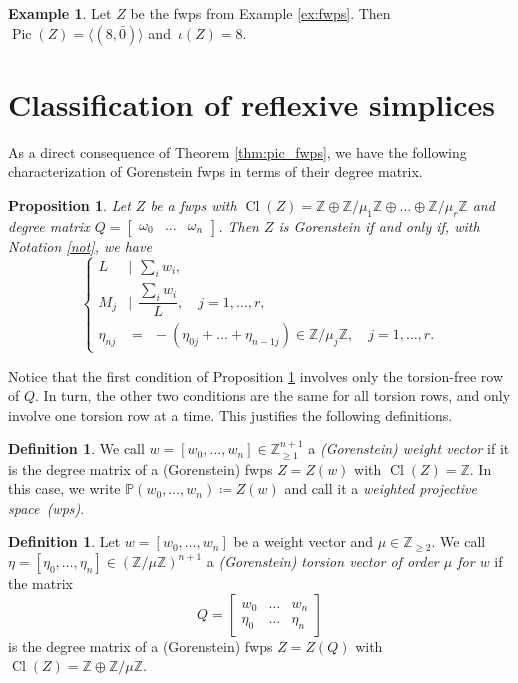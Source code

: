 \documentclass{amsart}
\DeclareMathOperator{\Cl}{Cl}
\DeclareMathOperator{\Pic}{Pic}
\newcommand{\Pp}{\mathbb{P}}
\newcommand{\Z}{\mathbb{Z}}
\newtheorem{proposition}[lem]{Proposition}
\theoremstyle{definition}
\newtheorem{definition}[lem]{Definition}
\newtheorem{example}[lem]{Example}
\begin{document}
\begin{example}
    Let $Z$ be the fwps from Example \ref{ex:fwps}. Then $\Pic(Z)=\langle(8,\bar{0})\rangle$ and~$\iota(Z)=8$.
\end{example}

\section{Classification of reflexive simplices}\label{sec:algos}

As a direct consequence of Theorem \ref{thm:pic_fwps}, we have the following characterization of Gorenstein fwps in terms of their degree matrix.

\begin{proposition}\label{prop:gor_fwps}
    Let $Z$ be a fwps with $\Cl(Z)=\Z\oplus \Z/\mu_1\Z\oplus\dots\oplus\Z/\mu_r\Z$ and  degree matrix $Q=\begin{bmatrix}
        \omega_0 & \dots & \omega_n
    \end{bmatrix}$.
    Then $Z$ is Gorenstein if and only if, with Notation \ref{not}, we have
    $$
    \begin{cases}
        L & | \ \ \sum_i w_i,\\[3pt]
        M_j & | \ \ \dfrac{\sum_{i}w_i}{L},\quad j=1,\dots,r,\\[5pt]
        \eta_{nj} & = \ \ -(\eta_{0j}+\dots+\eta_{n-1j})\in\Z/\mu_j\Z,\quad j=1,\dots,r.
    \end{cases}
    $$
\end{proposition}

Notice that the first condition of Proposition \ref{prop:gor_fwps} involves only the torsion-free row of $Q$. In turn, the other two conditions are the same for all torsion rows, and only involve one torsion row at a time. This justifies the following definitions.

\begin{definition}\label{weight_vec}
    We call $w=[w_0,\dots,w_n]\in\Z^{n+1}_{\geq 1}$ a \emph{(Gorenstein) weight vector} if it is the degree matrix of a (Gorenstein) fwps $Z=Z(w)$ with $\Cl(Z)=\Z$. In this case, we write $\Pp(w_0,\dots,w_n)\coloneqq Z(w)$ and call it a \emph{weighted projective space~(wps)}.
\end{definition}

\begin{definition}\label{def: torsion_vec}
    Let $w=[w_0,\dots,w_n]$ be a weight vector and $\mu\in\Z_{\geq 2}$. We call~$\eta=[\eta_0,\dots,\eta_n]\in(\Z/\mu\Z)^{n+1}$ a \emph{(Gorenstein) torsion vector of order $\mu$ for $w$} if the matrix
    $$Q=\begin{bmatrix}
        w_0&\dots & w_n\\
        \eta_0 & \dots & \eta_n
    \end{bmatrix}$$
    is the degree matrix of a (Gorenstein) fwps $Z=Z(Q)$ with $\Cl(Z)=\Z\oplus\Z/\mu\Z$.
    \end{definition}
    
\end{document}
